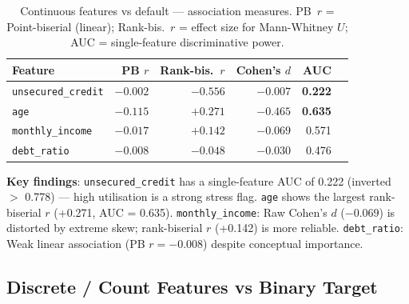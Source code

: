 \documentclass[11pt,a4paper]{article}
\begin{document}
\begin{table}[H]
\centering\footnotesize
\caption{Continuous features vs default --- association measures. PB~$r$ = Point-biserial (linear); Rank-bis.~$r$ = effect size for Mann-Whitney $U$; AUC = single-feature discriminative power.}
\begin{tabular}{@{}lrrrrr@{}}
\toprule
\textbf{Feature} & \textbf{PB $r$} & \textbf{Rank-bis.\ $r$} & \textbf{Cohen's $d$} & \textbf{AUC} \\
\midrule
\texttt{unsecured\_credit} & $-0.002$ & $-0.556$ & $-0.007$ & \textbf{0.222} \\
\texttt{age}               & $-0.115$ & $+0.271$ & $-0.465$ & \textbf{0.635} \\
\texttt{monthly\_income}   & $-0.017$ & $+0.142$ & $-0.069$ & 0.571 \\
\texttt{debt\_ratio}       & $-0.008$ & $-0.048$ & $-0.030$ & 0.476 \\
\bottomrule
\end{tabular}
\end{table}

\textbf{Key findings}: \texttt{unsecured\_credit} has a single-feature AUC of 0.222 (inverted $>$ 0.778) --- high utilisation is a strong stress flag.
\texttt{age} shows the largest rank-biserial $r$ (+0.271, AUC = 0.635).
\texttt{monthly\_income}: Raw Cohen's $d$ ($-0.069$) is distorted by extreme skew; rank-biserial $r$ (+0.142) is more reliable.
\texttt{debt\_ratio}: Weak linear association (PB $r = -0.008$) despite conceptual importance.

\subsection{Discrete / Count Features vs Binary Target}
\end{document}
